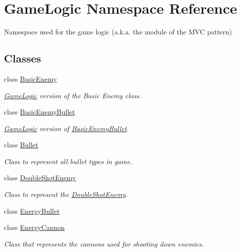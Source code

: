 \hypertarget{namespaceGameLogic}{}\section{Game\+Logic Namespace Reference}
\label{namespaceGameLogic}


Namespace used for the game logic (a.\+k.\+a. the module of the M\+VC pattern)  


\subsection*{Classes}
\begin{DoxyCompactItemize}
\item 
class \hyperlink{classGameLogic_1_1BasicEnemy}{Basic\+Enemy}
\begin{DoxyCompactList}\small\item\em \hyperlink{namespaceGameLogic}{Game\+Logic} version of the Basic Enemy class. \end{DoxyCompactList}\item 
class \hyperlink{classGameLogic_1_1BasicEnemyBullet}{Basic\+Enemy\+Bullet}
\begin{DoxyCompactList}\small\item\em \hyperlink{namespaceGameLogic}{Game\+Logic} version of \hyperlink{classGameLogic_1_1BasicEnemyBullet}{Basic\+Enemy\+Bullet}. \end{DoxyCompactList}\item 
class \hyperlink{classGameLogic_1_1Bullet}{Bullet}
\begin{DoxyCompactList}\small\item\em Class to represent all bullet types in game. \end{DoxyCompactList}\item 
class \hyperlink{classGameLogic_1_1DoubleShotEnemy}{Double\+Shot\+Enemy}
\begin{DoxyCompactList}\small\item\em Class to represent the \hyperlink{classGameLogic_1_1DoubleShotEnemy}{Double\+Shot\+Enemy}. \end{DoxyCompactList}\item 
class \hyperlink{classGameLogic_1_1EnergyBullet}{Energy\+Bullet}
\item 
class \hyperlink{classGameLogic_1_1EnergyCannon}{Energy\+Cannon}
\begin{DoxyCompactList}\small\item\em Class that represents the cannons used for shooting down enemies. \end{DoxyCompactList}\item 

\end{DoxyCompactItemize}
